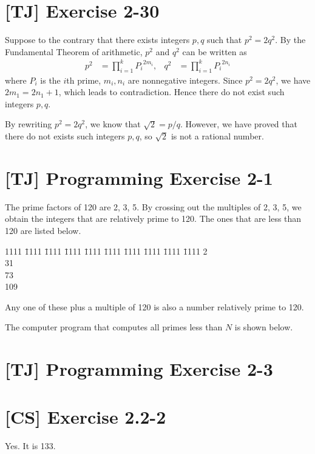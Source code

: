 \documentclass[a4paper,11pt,twocolumn]{article}
\begin{document}
  \section{[TJ] Exercise 2-30}
  Suppose to the contrary that there exists integers $p, q$ such that $p^2 = 2q^2$. By the Fundamental Theorem of arithmetic, $p^2$ and $q^2$ can be written as
  \begin{align*}
    p^2 &= \prod_{i=1}^{k} {P_i}^{2m_i},  &  q^2 &= \prod_{i=1}^{k} {P_i}^{2n_i}
  \end{align*}
  where $P_i$ is the $i$th prime, $m_i, n_i$ are nonnegative integers. Since $p^2 = 2q^2$, we have $2m_1 = 2n_1 + 1$, which leads to contradiction. Hence there do not exist such integers $p, q$. \par
  By rewriting $p^2 = 2q^2$, we know that $\sqrt{2} = p/q$. However, we have proved that there do not exists such integers $p, q$, so $\sqrt{2}$ is not a rational number.

  \section{[TJ] Programming Exercise 2-1}
  The prime factors of 120 are 2, 3, 5. By crossing out the multiples of 2, 3, 5, we obtain the integers that are relatively prime to 120. The ones that are less than 120 are listed below.
  \begin{tabbing}
    1111 \= 1111 \= 1111 \= 1111 \= 1111 \= 1111 \= 1111 \= 1111 \= 1111 \= 1111 \kill
    2          \\
    31          \\
    73          \\
    109  
  \end{tabbing}
  Any one of these plus a multiple of 120 is also a number relatively prime to 120. \par
  The computer program that computes all primes less than $N$ is shown below. 
  
  
  \section{[TJ] Programming Exercise 2-3}
  

  \section{[CS] Exercise 2.2-2}
  Yes. It is 133.
\end{document}
